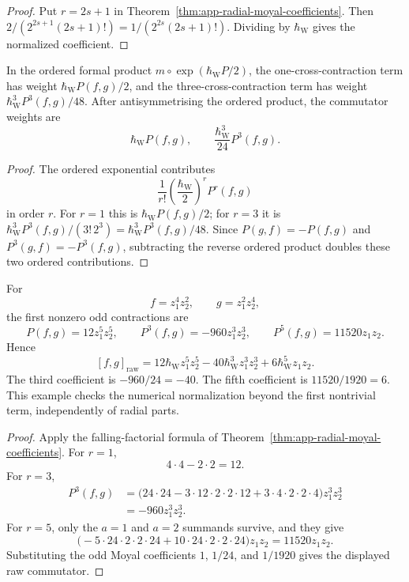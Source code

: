\begin{proof}
  Put \(r=2s+1\) in
  Theorem~\ref{thm:app-radial-moyal-coefficients}.  Then
  \(2/(2^{2s+1}(2s+1)!)=1/(2^{2s}(2s+1)!)\).  Dividing by \(\hbar_{\mathrm{W}}\)
  gives the normalized coefficient.
\end{proof}

\begin{cor}
\label{cor:app-formal-first-third-weights}
  In the ordered formal product
  \(m\circ\exp(\hbar_{\mathrm{W}} P/2)\), the one-cross-contraction term has weight
  \(\hbar_{\mathrm{W}} P(f,g)/2\), and the three-cross-contraction term has weight
  \(\hbar_{\mathrm{W}}^3P^3(f,g)/48\).  After antisymmetrising the ordered product,
  the commutator weights are
  \[
    \hbar_{\mathrm{W}} P(f,g),\qquad \frac{\hbar_{\mathrm{W}}^3}{24}P^3(f,g).
  \]
\end{cor}

\begin{proof}
  The ordered exponential contributes
  \[
    \frac{1}{r!}\left(\frac{\hbar_{\mathrm{W}}}{2}\right)^r P^r(f,g)
  \]
  in order \(r\).  For \(r=1\) this is \(\hbar_{\mathrm{W}} P(f,g)/2\); for \(r=3\)
  it is \(\hbar_{\mathrm{W}}^3P^3(f,g)/(3!\,2^3)=\hbar_{\mathrm{W}}^3P^3(f,g)/48\).  Since
  \(P(g,f)=-P(f,g)\) and \(P^3(g,f)=-P^3(f,g)\), subtracting the reverse
  ordered product doubles these two ordered contributions.
\end{proof}

\begin{ex}
\label{ex:app-radial-higher-moyal-check}
  For
  \[
    f=z_1^4z_2^2,\qquad g=z_1^2z_2^4,
  \]
  the first nonzero odd contractions are
  \[
    P(f,g)=12z_1^5z_2^5,\qquad
    P^3(f,g)=-960z_1^3z_2^3,\qquad
    P^5(f,g)=11520z_1z_2 .
  \]
  Hence
  \[
    [f,g]_{\mathrm{raw}}
      =
      12\hbar_{\mathrm{W}} z_1^5z_2^5
      -40\hbar_{\mathrm{W}}^3 z_1^3z_2^3
      +6\hbar_{\mathrm{W}}^5 z_1z_2 .
  \]
  The third coefficient is \(-960/24=-40\).  The fifth coefficient is
  \(11520/1920=6\).  This example checks the numerical normalization
  beyond the first nontrivial term, independently of radial parts.
\end{ex}

\begin{proof}
  Apply the falling-factorial formula of
  Theorem~\ref{thm:app-radial-moyal-coefficients}.  For \(r=1\),
  \[
    4\cdot4-2\cdot2=12.
  \]
  For \(r=3\),
  \[
  \begin{aligned}
    P^3(f,g)
    &=
      \bigl(24\cdot24
      -3\cdot12\cdot2\cdot2\cdot12
      +3\cdot4\cdot2\cdot2\cdot4\bigr)z_1^3z_2^3  \\
    &=-960z_1^3z_2^3 .
  \end{aligned}
  \]
  For \(r=5\), only the \(a=1\) and \(a=2\) summands survive, and they
  give
  \[
    \bigl(-5\cdot24\cdot2\cdot2\cdot24
      +10\cdot24\cdot2\cdot2\cdot24\bigr)z_1z_2
    =
    11520z_1z_2 .
  \]
  Substituting the odd Moyal coefficients
  \(1\), \(1/24\), and \(1/1920\) gives the displayed raw commutator.
\end{proof}

